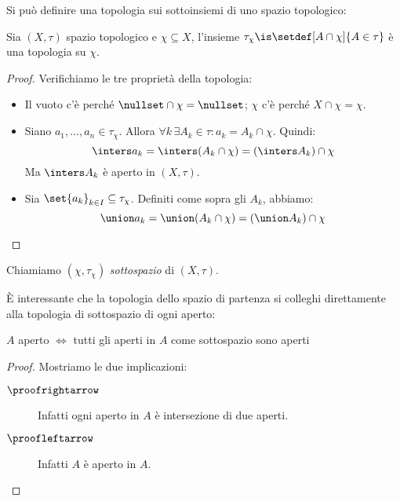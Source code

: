

Si può definire una topologia sui sottoinsiemi di uno spazio topologico: 

\begin{prop}
	Sia $(X,\tau)$ spazio topologico e $\chi\subseteq X$, l'insieme
	$\tau_\chi\is\setdef[A\cap\chi]{A\in\tau}$
	è una topologia su $\chi$.
\end{prop}

\begin{proof}
	Verifichiamo le tre proprietà della topologia:
	\begin{itemize}
		\item Il vuoto c'è perché $\nullset\cap\chi=\nullset$;
		$\chi$ c'è perché $X\cap\chi=\chi$.
		\item Siano $a_1,\ldots,a_n\in\tau_\chi$.
		Allora $\forall k\,\exists A_k\in\tau:a_k=A_k\cap\chi$.
		Quindi:
		\[\inters a_k=\inters(A_k\cap\chi)=\left(\inters A_k\right)\cap\chi\]
		Ma $\inters A_k$ è aperto in $(X,\tau)$.
		\item Sia $\set{a_k}_{k\in I}\subseteq\tau_\chi$.
		Definiti come sopra gli $A_k$, abbiamo:
		\[\union a_k=\union(A_k\cap\chi)=\left(\union A_k\right)\cap\chi \qedhere\]
	\end{itemize}
\end{proof}

\begin{defn}[Sottospazio]
	Chiamiamo $(\chi,\tau_\chi)$ \emph{sottospazio} di $(X,\tau)$.
\end{defn}

È interessante che la topologia dello spazio di partenza si colleghi direttamente alla topologia di sottospazio di ogni aperto:

\begin{prop}
	$A$ aperto $\iff$ tutti gli aperti in $A$ come sottospazio sono aperti
\end{prop}

\begin{proof}
	Mostriamo le due implicazioni:
	\begin{description}
		\item[$\proofrightarrow$]
		Infatti ogni aperto in $A$ è intersezione di due aperti.
		\item[$\proofleftarrow$]
		Infatti $A$ è aperto in $A$. \qedhere
	\end{description}
\end{proof}


